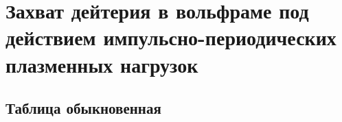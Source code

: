 \chapter{Захват дейтерия в вольфраме под действием импульсно-периодических плазменных нагрузок}\label{ch:ch3}

\section{Таблица обыкновенная}\label{sec:ch3/sect1}

\clearpage
